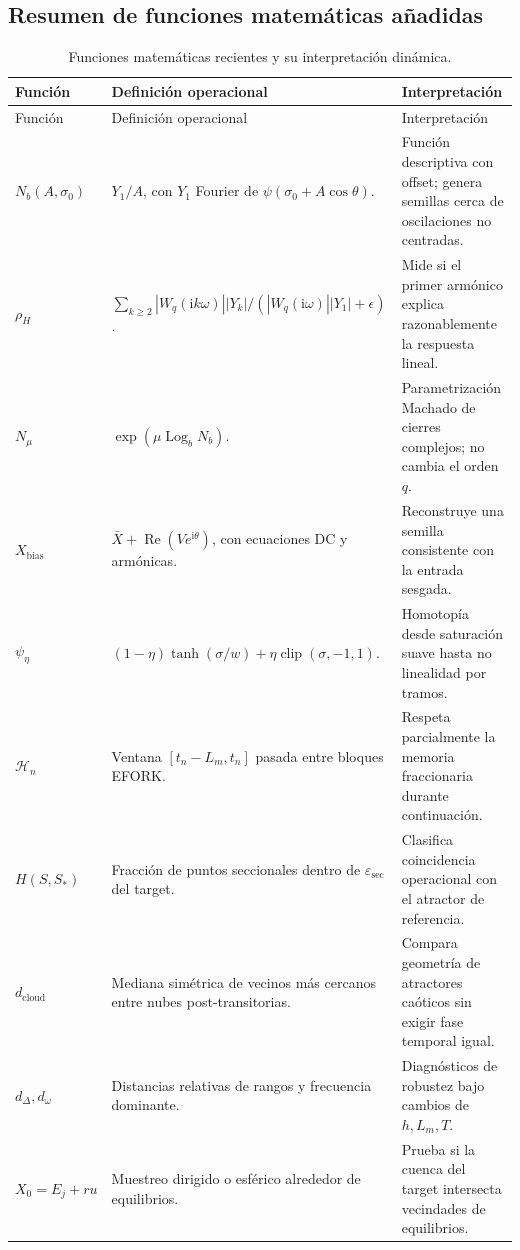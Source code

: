 \documentclass[11pt]{article}
\newcommand{\ii}{\mathrm{i}}
\newcommand{\clip}{\operatorname{clip}}
\newcommand{\Log}{\operatorname{Log}}
\begin{document}
\subsection{Resumen de funciones matemáticas añadidas}

\begin{longtable}{@{}p{3.0cm}p{5.6cm}p{5.4cm}@{}}
\caption{Funciones matemáticas recientes y su interpretación dinámica.}\\
\toprule
Función & Definición operacional & Interpretación \\
\midrule
\endfirsthead
\toprule
Función & Definición operacional & Interpretación \\
\midrule
\endhead
\(N_b(A,\sigma_0)\) &
\(Y_1/A\), con \(Y_1\) Fourier de \(\psi(\sigma_0+A\cos\theta)\). &
Función descriptiva con offset; genera semillas cerca de oscilaciones no
centradas. \\
\(\rho_H\) &
\(\sum_{k\geq2}|W_q(\ii k\omega)||Y_k|/(|W_q(\ii\omega)||Y_1|+\epsilon)\). &
Mide si el primer armónico explica razonablemente la respuesta lineal. \\
\(N_\mu\) &
\(\exp(\mu\Log_b N_b)\). &
Parametrización Machado de cierres complejos; no cambia el orden \(q\). \\
\(X_{\mathrm{bias}}\) &
\(\bar X+\operatorname{Re}(Ve^{\ii\theta})\), con ecuaciones DC y armónicas. &
Reconstruye una semilla consistente con la entrada sesgada. \\
\(\psi_\eta\) &
\((1-\eta)\tanh(\sigma/w)+\eta\clip(\sigma,-1,1)\). &
Homotopía desde saturación suave hasta no linealidad por tramos. \\
\(\mathcal{H}_n\) &
Ventana \([t_n-L_m,t_n]\) pasada entre bloques EFORK. &
Respeta parcialmente la memoria fraccionaria durante continuación. \\
\(H(S,S_\ast)\) &
Fracción de puntos seccionales dentro de \(\varepsilon_{\mathrm{sec}}\) del
target. &
Clasifica coincidencia operacional con el atractor de referencia. \\
\(d_{\mathrm{cloud}}\) &
Mediana simétrica de vecinos más cercanos entre nubes post-transitorias. &
Compara geometría de atractores caóticos sin exigir fase temporal igual. \\
\(d_\Delta,d_\omega\) &
Distancias relativas de rangos y frecuencia dominante. &
Diagnósticos de robustez bajo cambios de \(h,L_m,T\). \\
\(X_0=E_j+ru\) &
Muestreo dirigido o esférico alrededor de equilibrios. &
Prueba si la cuenca del target intersecta vecindades de equilibrios. \\
\bottomrule
\end{longtable}
\end{document}
